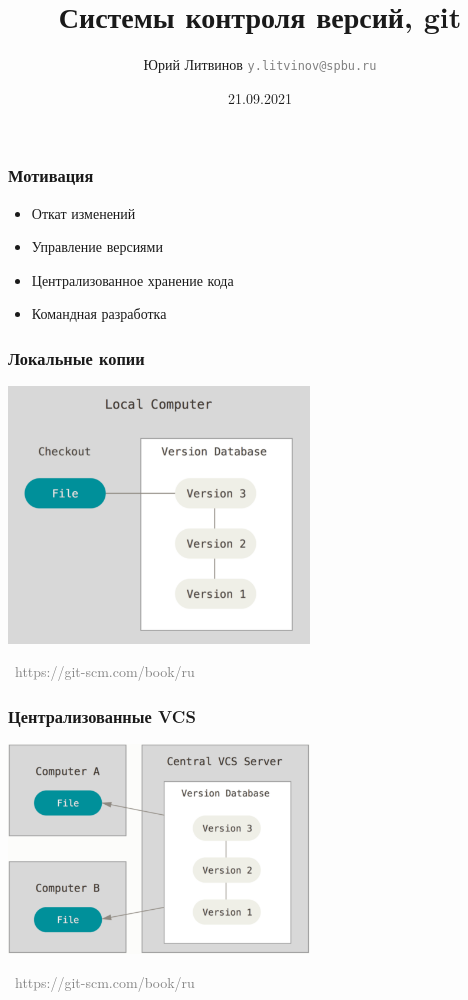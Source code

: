\documentclass[xetex,mathserif,serif]{beamer}
\title{Системы контроля версий, git}
\author[Юрий Литвинов]{Юрий Литвинов \newline \textcolor{gray}{\small\texttt{y.litvinov@spbu.ru}}}
\date{21.09.2021}
\newcommand{\attribution}[1] {
    \vspace{-5mm}\begin{flushright}\begin{scriptsize}\textcolor{gray}{\textcopyright\, #1}\end{scriptsize}\end{flushright}
}
\begin{document}
    
    \frame{\titlepage}
    
    \begin{frame}
        \frametitle{Мотивация}
        \begin{itemize}
            \item Откат изменений
            \item Управление версиями
            \item Централизованное хранение кода
            \item Командная разработка
        \end{itemize}
    \end{frame}

    \begin{frame}
        \frametitle{Локальные копии}
        \begin{center}
            \includegraphics[width=0.6\textwidth]{localCopies.png}
            \attribution{https://git-scm.com/book/ru}
        \end{center}
    \end{frame}

    \begin{frame}
        \frametitle{Централизованные VCS}
        \begin{center}
            \includegraphics[width=0.6\textwidth]{centralizedVcs.png}
            \attribution{https://git-scm.com/book/ru}
        \end{center}
    \end{frame}
\end{document}
